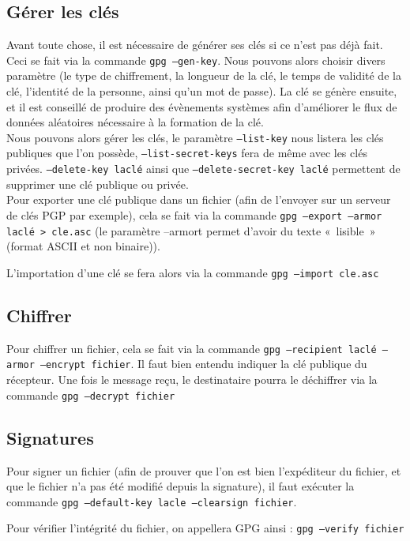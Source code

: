 \subsection{Gérer les clés}
Avant toute chose, il est nécessaire de générer ses clés si ce
n'est pas déjà fait. Ceci se fait via la commande \texttt{gpg
--gen-key}. Nous pouvons alors choisir divers paramètre (le type
de chiffrement, la longueur de la clé, le temps de validité de la
clé, l'identité de la personne, ainsi qu'un mot de passe).
La clé se génère ensuite, et il est conseillé de produire des
évènements systèmes afin d'améliorer le flux de données
aléatoires nécessaire à la formation de la clé.
\\

Nous pouvons alors gérer les clés, le paramètre
\texttt{--list-key} nous listera les clés publiques que l'on
possède, \texttt{--list-secret-keys} fera de même avec les clés
privées. \texttt{--delete-key laclé} ainsi que
\texttt{--delete-secret-key laclé} permettent de supprimer une clé
publique ou privée.
\\

Pour exporter une clé publique dans un fichier (afin de l'envoyer sur un
serveur de clés PGP par exemple), cela se fait via la commande
\texttt{gpg --export --armor laclé > cle.asc} (le paramètre
--armort permet d'avoir du texte «~lisible~» (format ASCII et non
binaire)).

L'importation d'une clé se fera alors via la commande \texttt{gpg
--import cle.asc}
\subsection{Chiffrer}
Pour chiffrer un fichier, cela se fait via la commande \texttt{gpg
--recipient laclé --armor --encrypt fichier}. Il faut bien entendu
indiquer la clé publique du récepteur.
Une fois le message reçu, le destinataire pourra le déchiffrer via
la commande \texttt{gpg --decrypt fichier}
\subsection{Signatures}
Pour signer un fichier (afin de prouver que l'on est bien
l'expéditeur du fichier, et que le fichier n'a pas été modifié
depuis la signature), il faut exécuter la commande \texttt{gpg
--default-key lacle --clearsign fichier}.

Pour vérifier l'intégrité du fichier, on appellera GPG ainsi :
\texttt{gpg --verify fichier}
